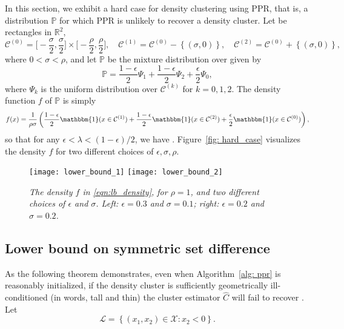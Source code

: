 \documentclass[11pt,twoside]{article}
\newcommand{\set}[1]{\left\{#1\right\}}
\newcommand{\Reals}{\mathbb{R}}
\newcommand{\1}{\mathbbm{1}}
\newcommand{\Pbb}{\mathbb{P}}
\newcommand{\Cbb}{\mathbb{C}}
\newcommand{\Cset}{\mathcal{C}}
\newcommand{\Cest}{\widehat{C}}
\begin{document}
In this section, we exhibit a hard case for density clustering using PPR, that 
is, a distribution $\Pbb$ for which PPR is unlikely to recover a density
cluster. Let \smash{$\Cset^{(0)}, \Cset^{(1)}, \Cset^{(2)}$} be rectangles in
$\Reals^2$,    
$$
\Cset^{(0)} = \biggl[-\frac{\sigma}{2}, \frac{\sigma}{2}\biggr] \times 
\biggl[-\frac{\rho}{2}, \frac{\rho}{2}\biggr], \quad 
\Cset^{(1)} = \Cset^{(0)} - \set{(\sigma,0)}, \quad
\Cset^{(2)} = \Cset^{(0)} + \set{(\sigma,0)},
$$
where $0 < \sigma < \rho$, and let $\Pbb$ be the mixture distribution over
\smash{$\mathcal{X} = \Cset^{(0)} \cup \Cset^{(1)} \cup \Cset^{(2)}$} given by   
$$
\Pbb = \frac{1 - \epsilon}{2} \Psi_1 + \frac{1 - \epsilon}{2} \Psi_2 +
\frac{\epsilon}{2} \Psi_0, 
$$
where $\Psi_k$ is the uniform distribution over $\Cset^{(k)}$ for $k = 0,1,2$.  
The density function $f$ of $\Pbb$ is simply
\begin{equation}
\label{eqn:lb_density}
f(x) = \frac{1}{\rho\sigma}\left(\frac{1 - \epsilon}{2}\1(x \in
  \Cset^{(1)}) + \frac{1 - \epsilon}{2}\1(x \in \Cset^{(2)}) +
  \frac{\epsilon}{2}\1(x \in \Cset^{(0)})  \right), 
\end{equation}
so that for any $\epsilon < \lambda < (1 - \epsilon)/2$, we have 
\smash{$\Cbb_f(\lambda) = \set{\Cset^{(1)}, \Cset^{(2)}}$}. Figure~\ref{fig:
  hard_case} visualizes the density $f$ for two different choices of $\epsilon,
\sigma, \rho$.  

\begin{figure}[tb]
  \centering
  \texttt{[image: lower\_bound\_1]}
  \texttt{[image: lower\_bound\_2]}
  \caption{\it\small The density $f$ in \eqref{eqn:lb_density}, for
    $\rho=1$, and two different choices of $\epsilon$ and $\sigma$. Left:
    $\epsilon = 0.3$ and $\sigma = 0.1$; right: $\epsilon = 0.2$ and 
    $\sigma = 0.2$.} 
  \label{fig: hard_case}
\end{figure}

\subsection{Lower bound on symmetric set difference}

As the following theorem demonstrates, even when Algorithm~\ref{alg: ppr} is
reasonably initialized, if the density cluster \smash{$\Cset^{(1)}$} is 
sufficiently geometrically ill-conditioned (in words, tall and thin) the cluster 
estimator $\Cest$ will fail to recover \smash{$\Cset^{(1)}$}. Let
\begin{equation}
\label{eqn:lower_set}
\mathcal{L} = \set{(x_1,x_2) \in \mathcal{X}: x_2 < 0}.
\end{equation}
\end{document}
